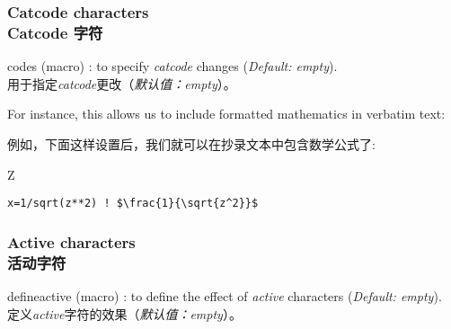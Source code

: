 \documentclass[twoside]{article}
\providecommand\optname[1]{\textsf{#1}}
\newenvironment{optlist}{\begin{description}%
  \renewcommand\makelabel[1]{%
    \descriptionlabel{\mdseries\optname{##1}}}%
  \itemsep0.25\itemsep}%
 {\end{description}}
\begin{document}
\subsubsection{Catcode characters\\Catcode 字符}


\begin{optlist}
  \item[codes (macro)]: to specify \emph{catcode} changes (\emph{Default:
  empty}).
\\用于指定\emph{catcode}更改（\emph{默认值：empty}）。
\end{optlist}

  For instance, this allows us to include formatted mathematics in verbatim
text:

例如，下面这样设置后，我们就可以在抄录文本中包含数学公式了:

{
\begin{SideBySideExample}
  Z
  \begin{Verbatim}[commandchars=\\\{\},
         codes={\catcode`$=3\catcode`^=7}]
    x=1/sqrt(z**2) ! $\frac{1}{\sqrt{z^2}}$
  \end{Verbatim}
\end{SideBySideExample}
}  %


\subsubsection{Active characters\\活动字符}


\begin{optlist}
  \item[defineactive (macro)]: to define the effect of \emph{active}
  characters
  (\emph{Default: empty}).
\\定义\emph{active}字符的效果（\emph{默认值：empty}）。
\end{optlist}

\end{document}
